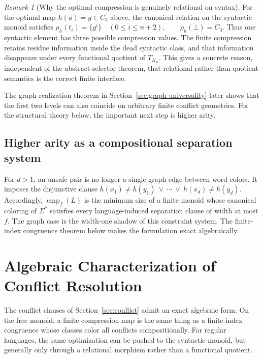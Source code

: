 \documentclass[10pt,a4paper]{article}
\theoremstyle{definition}
\theoremstyle{remark}
\newtheorem{remark}[theorem]{Remark}
\newcommand{\cmp}{\operatorname{cmp}}
\begin{document}
\begin{remark}[Why the optimal compression is genuinely relational on syntax]
\label{conf:rem:genuinely-relational}
For the optimal map $h(a)=g\in C_3$ above, the canonical relation on the
syntactic monoid satisfies
\(\rho_h(t_i)=\{g^i\}\quad(0\le i\le n+2), \qquad \rho_h(\bot)=C_3.\)
Thus one syntactic element has three possible compression values.  The finite
compression retains residue information inside the dead syntactic class, and
that information disappears under every functional quotient of $T_{K_n}$.
This gives a concrete reason, independent of the abstract selector theorem,
that relational rather than quotient semantics is the correct finite
interface.
\end{remark}

The graph-realization theorem in Section~\ref{sec:graph-universality} later
shows that the first two levels can also coincide on arbitrary finite conflict
geometries.  For the structural theory below, the important next step is higher
arity.

\subsection{Higher arity as a compositional separation system}

For \(d>1\), an unsafe pair is no longer a single graph edge between word
colors. It imposes the disjunctive clause
\(h(x_1)\neq h(y_1) \ \vee\ \cdots\ \vee\ h(x_d)\neq h(y_d).\)
Accordingly, \(\cmp_f(L)\) is the minimum size of a finite monoid whose
canonical coloring of \(\Sigma^*\) satisfies every language-induced
separation clause of width at most \(f\). The graph case is the width-one
shadow of this constraint system. The finite-index congruence theorem below
makes the formulation exact algebraically.

\section{Algebraic Characterization of Conflict Resolution}
\label{sec:algebraic-conflict}

The conflict clauses of Section~\ref{sec:conflict} admit an exact algebraic form. On the free monoid, a finite compression map is the same thing as a finite-index congruence whose classes color all conflicts compositionally. For regular languages, the same optimization can be pushed to the syntactic monoid, but generally only through a relational morphism rather than a functional quotient.
\end{document}
